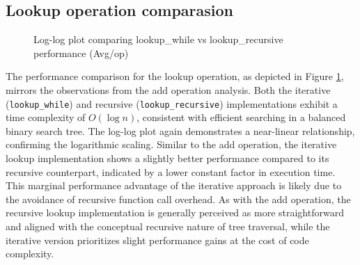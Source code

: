 \documentclass[a4paper,11pt]{article}
\begin{document}
\subsection*{Lookup operation comparasion}
\begin{figure}[h]
    \centering
    \caption{Log-log plot comparing lookup\_while vs lookup\_recursive performance (Avg/op)}
    \label{fig:lookup_operations_comparison}
\end{figure}
The performance comparison for the lookup operation, as depicted in Figure \ref{fig:lookup_operations_comparison}, mirrors the observations from the add operation analysis. Both the iterative (\texttt{lookup\_while}) and recursive (\texttt{lookup\_recursive}) implementations exhibit a time complexity of $O(\log n)$, consistent with efficient searching in a balanced binary search tree. The log-log plot again demonstrates a near-linear relationship, confirming the logarithmic scaling. Similar to the add operation, the iterative lookup implementation shows a slightly better performance compared to its recursive counterpart, indicated by a lower constant factor in execution time. This marginal performance advantage of the iterative approach is likely due to the avoidance of recursive function call overhead. As with the add operation, the recursive lookup implementation is generally perceived as more straightforward and aligned with the conceptual recursive nature of tree traversal, while the iterative version prioritizes slight performance gains at the cost of code complexity.
\end{document}
